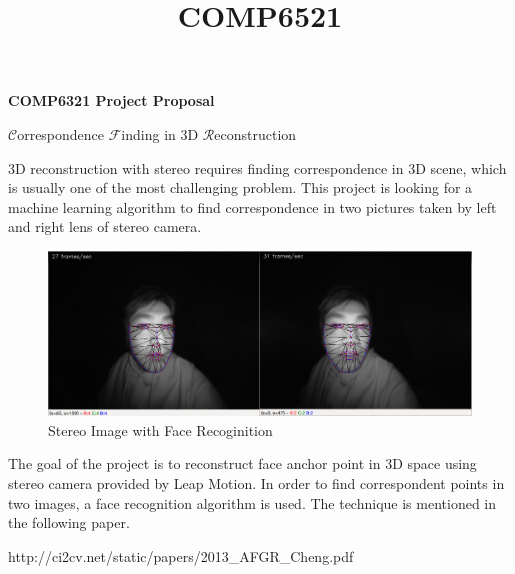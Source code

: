 \documentclass[letterpaper, 12pt, titlepage]{article}
\begin{document}
\title{COMP6521}
\setcounter{tocdepth}{2}
\newpage
\begin{center}
    {\bf\large COMP6321 Project Proposal}

    $\mathcal{C}$orrespondence $\mathcal{F}$inding in 3D $\mathcal{R}$econstruction

     \vspace{1cm}
    \vspace{0.1cm}
\end{center}

3D reconstruction with stereo requires finding correspondence in 3D scene, which is usually one of the most challenging problem. This project is looking for a machine learning algorithm to find correspondence in two pictures taken by left and right lens of stereo camera.
\begin{figure}[H]
\centering
\includegraphics[width=12cm]{stereoImage.eps}
\caption{Stereo Image with Face Recoginition}
\label{Q1}
\end{figure}

The goal of the project is to reconstruct face anchor point in 3D space using stereo camera provided by Leap Motion. In order to find correspondent points in two images, a face recognition algorithm is used. The technique is mentioned in the following paper. 

http://ci2cv.net/static/papers/2013\_AFGR\_Cheng.pdf











  

        
\end{document}
